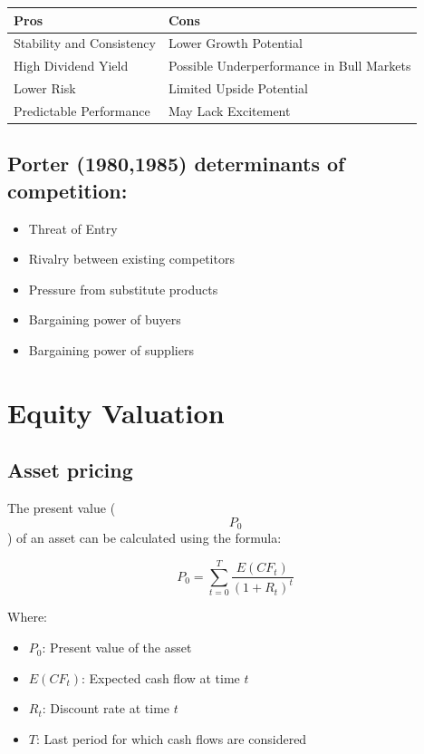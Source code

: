 \documentclass[
]{book}
\providecommand{\tightlist}{%
  \setlength{\itemsep}{0pt}\setlength{\parskip}{0pt}}
\begin{document}
\begin{longtable}[]{@{}ll@{}}
\toprule\noalign{}
Pros & Cons \\
\midrule\noalign{}
\endhead
\bottomrule\noalign{}
\endlastfoot
Stability and Consistency & Lower Growth Potential \\
High Dividend Yield & Possible Underperformance in Bull Markets \\
Lower Risk & Limited Upside Potential \\
Predictable Performance & May Lack Excitement \\
\end{longtable}

\hypertarget{porter-19801985-determinants-of-competition}{%
\subsection{Porter (1980,1985) determinants of competition:}\label{porter-19801985-determinants-of-competition}}

\begin{itemize}
\tightlist
\item
  Threat of Entry
\item
  Rivalry between existing competitors
\item
  Pressure from substitute products
\item
  Bargaining power of buyers
\item
  Bargaining power of suppliers
\end{itemize}

\hypertarget{equity-valuation}{%
\section{Equity Valuation}\label{equity-valuation}}

\hypertarget{asset-pricing}{%
\subsection{Asset pricing}\label{asset-pricing}}

The present value (\[ P_0 \]) of an asset can be calculated using the formula:

\[ P_0 = \sum_{t=0}^{T} \frac{E(CF_t)}{(1+R_t)^t} \]

Where:

\begin{itemize}
\tightlist
\item
  \(P_0\): Present value of the asset
\item
  \(E(CF_t)\): Expected cash flow at time \(t\)
\item
  \(R_t\): Discount rate at time \(t\)
\item
  \(T\): Last period for which cash flows are considered
\end{itemize}
\end{document}
